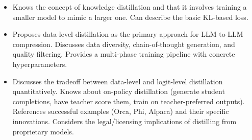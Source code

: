\begin{interviewq}

\goodgreat
\begin{itemize}
    \item {} Knows the concept of knowledge distillation and that it involves training a smaller model to mimic a larger one. Can describe the basic KL-based loss.
    \item {} Proposes data-level distillation as the primary approach for LLM-to-LLM compression. Discusses data diversity, chain-of-thought generation, and quality filtering. Provides a multi-phase training pipeline with concrete hyperparameters.
    \item {} Discusses the tradeoff between data-level and logit-level distillation quantitatively. Knows about on-policy distillation (generate student completions, have teacher score them, train on teacher-preferred outputs). References successful examples (Orca, Phi, Alpaca) and their specific innovations. Considers the legal/licensing implications of distilling from proprietary models.
\end{itemize}

\end{interviewq}


